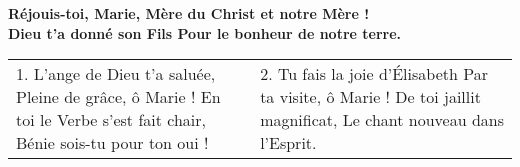 
\textbf{
Réjouis-toi, Marie,
Mère du Christ et notre Mère !\\
Dieu t’a donné son Fils
Pour le bonheur de notre terre.
}

\begin{tabular}{@{}p{} p{}@{}}
1.
L’ange de Dieu t’a saluée,\newline
Pleine de grâce, ô Marie !\newline
En toi le Verbe s’est fait chair,\newline
Bénie sois-tu pour ton oui !
&
2.
Tu fais la joie d’Élisabeth\newline
Par ta visite, ô Marie !\newline
De toi jaillit magnificat,\newline
Le chant nouveau dans l’Esprit.
\end{tabular}
